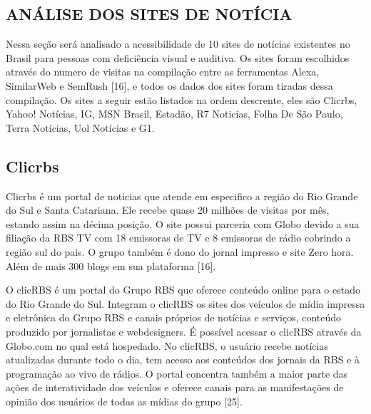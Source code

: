\documentclass[a4paper]{article}
\begin{document}
\begin{titlepage}
\section{ANÁLISE DOS SITES DE NOTÍCIA}

Nessa seção será analisado a acessibilidade de 10 sites de notícias existentes no Brasil para pessoas com deficiência visual e auditiva. Os sites foram escolhidos através do numero de visitas na compilação entre as ferramentas Alexa, SimilarWeb e SemRush [16], e todos os dados dos sites foram tiradas dessa compilação. Os sites a seguir estão listados na ordem descrente, eles são Clicrbs, Yahoo! Notícias, IG, MSN Brasil, Estadão, R7 Noticias, Folha De São Paulo, Terra Notícias, Uol Notícias e G1.

\subsection{Clicrbs}

Clicrbs é um portal de noticias que atende em especifico a região do Rio Grande do Sul e Santa Catariana. Ele recebe quase 20 milhões de visitas por mês, estando assim na décima posição. O site possui parceria com Globo devido a sua filiação da RBS TV com 18 emissoras de TV e 8 emissoras de rádio cobrindo a região sul do pais. O grupo também é dono do jornal impresso e site Zero hora. Além de mais 300 blogs em sua plataforma [16].

O clicRBS é um portal do Grupo RBS que oferece conteúdo online para o estado do Rio Grande do Sul. Integram o clicRBS os sites dos veículos de mídia impressa e eletrônica do Grupo RBS e canais próprios de notícias e serviços, conteúdo produzido por jornalistas e webdesigners. É possível acessar o clicRBS através da Globo.com no qual está hospedado. No clicRBS, o usuário recebe notícias atualizadas durante todo o dia, tem acesso aos conteúdos dos jornais da RBS e à programação ao vivo de rádios. O portal concentra também a maior parte das ações de interatividade dos veículos e oferece canais para as manifestações de opinião dos usuários de todas as mídias do grupo [25].


\end{titlepage}
\end{document}
